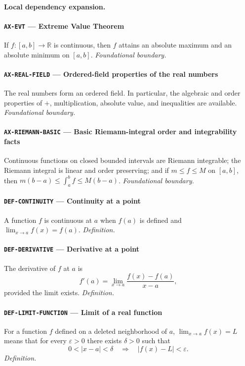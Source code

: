 \documentclass[10pt]{article}
\newcommand{\pidraw}[1]{\begingroup\urlstyle{tt}\nolinkurl{#1}\endgroup}
\theoremstyle{definition}
\theoremstyle{remark}
\begin{document}
\paragraph{Local dependency expansion.}

\paragraph{\pidraw{AX-EVT} --- Extreme Value Theorem}
If $f:[a,b]\to\mathbb{R}$ is continuous, then $f$ attains an absolute maximum and an absolute minimum on $[a,b]$.
\textit{Foundational boundary.}

\paragraph{\pidraw{AX-REAL-FIELD} --- Ordered-field properties of the real numbers}
The real numbers form an ordered field. In particular, the algebraic and order properties of $+$, multiplication, absolute value, and inequalities are available.
\textit{Foundational boundary.}

\paragraph{\pidraw{AX-RIEMANN-BASIC} --- Basic Riemann-integral order and integrability facts}
Continuous functions on closed bounded intervals are Riemann integrable; the Riemann integral is linear and order preserving; and if $m\le f\le M$ on $[a,b]$, then $m(b-a)\le\int_a^b f\le M(b-a)$.
\textit{Foundational boundary.}

\paragraph{\pidraw{DEF-CONTINUITY} --- Continuity at a point}
A function $f$ is continuous at $a$ when $f(a)$ is defined and $\lim_{x\to a}f(x)=f(a)$.
\textit{Definition.}

\paragraph{\pidraw{DEF-DERIVATIVE} --- Derivative at a point}
The derivative of $f$ at $a$ is
\[
f'(a)=\lim_{x\to a}\frac{f(x)-f(a)}{x-a},
\]
provided the limit exists.
\textit{Definition.}

\paragraph{\pidraw{DEF-LIMIT-FUNCTION} --- Limit of a real function}
For a function $f$ defined on a deleted neighborhood of $a$, $\lim_{x\to a}f(x)=L$ means that for every $\varepsilon>0$ there exists $\delta>0$ such that
\[
0<|x-a|<\delta\quad\Longrightarrow\quad |f(x)-L|<\varepsilon.
\]
\textit{Definition.}
\end{document}
